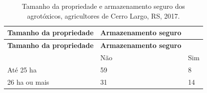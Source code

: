 \documentclass[12pt,brazil,oneside]{book}
\begin{document}
\begin{longtable}[]{@{}lll@{}}
\caption{\label{tab:tamprop}Tamanho da propriedade e armazenamento seguro
dos agrotóxicos, agricultores de Cerro Largo, RS, 2017.}\tabularnewline
\toprule
\begin{minipage}[b]{0.35\columnwidth}\raggedright
\textbf{Tamanho da propriedade}\strut
\end{minipage} & \begin{minipage}[b]{0.32\columnwidth}\raggedright
\textbf{Armazenamento seguro}\strut
\end{minipage} & \begin{minipage}[b]{0.15\columnwidth}\raggedright
\strut
\end{minipage}\tabularnewline
\midrule
\endfirsthead
\toprule
\begin{minipage}[b]{0.35\columnwidth}\raggedright
\textbf{Tamanho da propriedade}\strut
\end{minipage} & \begin{minipage}[b]{0.32\columnwidth}\raggedright
\textbf{Armazenamento seguro}\strut
\end{minipage} & \begin{minipage}[b]{0.15\columnwidth}\raggedright
\strut
\end{minipage}\tabularnewline
\midrule
\endhead
\begin{minipage}[t]{0.35\columnwidth}\raggedright
\strut
\end{minipage} & \begin{minipage}[t]{0.32\columnwidth}\raggedright
Não\strut
\end{minipage} & \begin{minipage}[t]{0.15\columnwidth}\raggedright
Sim\strut
\end{minipage}\tabularnewline
\begin{minipage}[t]{0.35\columnwidth}\raggedright
Até 25 ha\strut
\end{minipage} & \begin{minipage}[t]{0.32\columnwidth}\raggedright
59\strut
\end{minipage} & \begin{minipage}[t]{0.15\columnwidth}\raggedright
8\strut
\end{minipage}\tabularnewline
\begin{minipage}[t]{0.35\columnwidth}\raggedright
26 ha ou mais\strut
\end{minipage} & \begin{minipage}[t]{0.32\columnwidth}\raggedright
31\strut
\end{minipage} & \begin{minipage}[t]{0.15\columnwidth}\raggedright
14\strut
\end{minipage}\tabularnewline
\bottomrule
\end{longtable}
\end{document}
